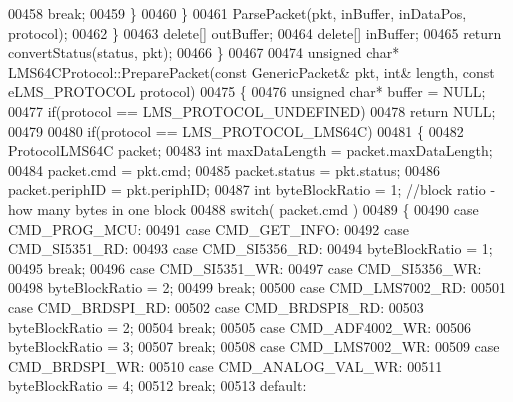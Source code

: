 \begin{DoxyCode}
{{{{{00458                 \textcolor{keywordflow}{break};
00459             \}
00460         \}
00461         ParsePacket(pkt, inBuffer, inDataPos, protocol);
00462     \}
00463     \textcolor{keyword}{delete}[] outBuffer;
00464     \textcolor{keyword}{delete}[] inBuffer;
00465     \textcolor{keywordflow}{return} convertStatus(status, pkt);
00466 \}
00467 
00474 \textcolor{keywordtype}{unsigned} \textcolor{keywordtype}{char}* LMS64CProtocol::PreparePacket(\textcolor{keyword}{const} GenericPacket& pkt, \textcolor{keywordtype}{int}& 
      length, \textcolor{keyword}{const} eLMS_PROTOCOL protocol)
00475 \{
00476     \textcolor{keywordtype}{unsigned} \textcolor{keywordtype}{char}* buffer = NULL;
00477     \textcolor{keywordflow}{if}(protocol == LMS_PROTOCOL_UNDEFINED)
00478         \textcolor{keywordflow}{return} NULL;
00479 
00480     \textcolor{keywordflow}{if}(protocol == LMS_PROTOCOL_LMS64C)
00481     \{
00482         ProtocolLMS64C packet;
00483         \textcolor{keywordtype}{int} maxDataLength = packet.maxDataLength;
00484         packet.cmd = pkt.cmd;
00485         packet.status = pkt.status;
00486         packet.periphID = pkt.periphID;
00487         \textcolor{keywordtype}{int} byteBlockRatio = 1; \textcolor{comment}{//block ratio - how many bytes in one block}
00488         \textcolor{keywordflow}{switch}( packet.cmd )
00489         \{
00490         \textcolor{keywordflow}{case} CMD_PROG_MCU:
00491         \textcolor{keywordflow}{case} CMD_GET_INFO:
00492         \textcolor{keywordflow}{case} CMD_SI5351_RD:
00493         \textcolor{keywordflow}{case} CMD_SI5356_RD:
00494             byteBlockRatio = 1;
00495             \textcolor{keywordflow}{break};
00496         \textcolor{keywordflow}{case} CMD_SI5351_WR:
00497         \textcolor{keywordflow}{case} CMD_SI5356_WR:
00498             byteBlockRatio = 2;
00499             \textcolor{keywordflow}{break};
00500         \textcolor{keywordflow}{case} CMD_LMS7002_RD:
00501         \textcolor{keywordflow}{case} CMD_BRDSPI_RD:
00502         \textcolor{keywordflow}{case} CMD_BRDSPI8_RD:
00503             byteBlockRatio = 2;
00504             \textcolor{keywordflow}{break};
00505         \textcolor{keywordflow}{case} CMD_ADF4002_WR:
00506             byteBlockRatio = 3;
00507             \textcolor{keywordflow}{break};
00508         \textcolor{keywordflow}{case} CMD_LMS7002_WR:
00509         \textcolor{keywordflow}{case} CMD_BRDSPI_WR:
00510         \textcolor{keywordflow}{case} CMD_ANALOG_VAL_WR:
00511             byteBlockRatio = 4;
00512             \textcolor{keywordflow}{break};
00513         \textcolor{keywordflow}{default}:
}}}}}
\end{DoxyCode}
